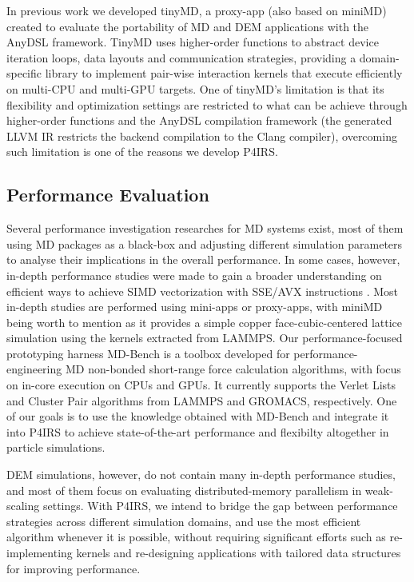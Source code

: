 \documentclass[preprint,12pt]{elsarticle}
\begin{document}
In previous work we developed tinyMD, a proxy-app (also based on miniMD) created to evaluate the portability of MD and DEM applications with the AnyDSL \cite{anydsl1,anydsl2} framework.
TinyMD uses higher-order functions to abstract device iteration loops, data layouts and communication strategies, providing a domain-specific library to implement pair-wise interaction kernels that execute efficiently on multi-CPU and multi-GPU targets.
One of tinyMD's limitation is that its flexibility and optimization settings are restricted to what can be achieve through higher-order functions and the AnyDSL compilation framework (the generated LLVM IR restricts the backend compilation to the Clang compiler), overcoming such limitation is one of the reasons we develop P4IRS.


\subsection{Performance Evaluation}
\label{sec:perfeval}

Several performance investigation researches for MD systems exist, most of them using MD packages as a black-box and adjusting different simulation parameters to analyse their implications in the overall performance.
In some cases, however, in-depth performance studies were made to gain a broader understanding on efficient ways to achieve SIMD vectorization with SSE/AVX instructions \cite{mdsimd}.
Most in-depth studies are performed using mini-apps or proxy-apps, with miniMD being worth to mention as it provides a simple copper face-cubic-centered lattice simulation using the kernels extracted from LAMMPS.
Our performance-focused prototyping harness MD-Bench \cite{mdbench1,mdbench2} is a toolbox developed for performance-engineering \ac{MD} non-bonded short-range force calculation algorithms, with focus on in-core execution on CPUs and GPUs.
It currently supports the Verlet Lists and Cluster Pair algorithms from LAMMPS and GROMACS, respectively.
One of our goals is to use the knowledge obtained with MD-Bench and integrate it into P4IRS to achieve state-of-the-art performance and flexibilty altogether in particle simulations.

DEM simulations, however, do not contain many in-depth performance studies, and most of them focus on evaluating distributed-memory parallelism in weak-scaling settings.
With P4IRS, we intend to bridge the gap between performance strategies across different simulation domains, and use the most efficient algorithm whenever it is possible, without requiring significant efforts such as re-implementing kernels and re-designing applications with tailored data structures for improving performance.
\end{document}
